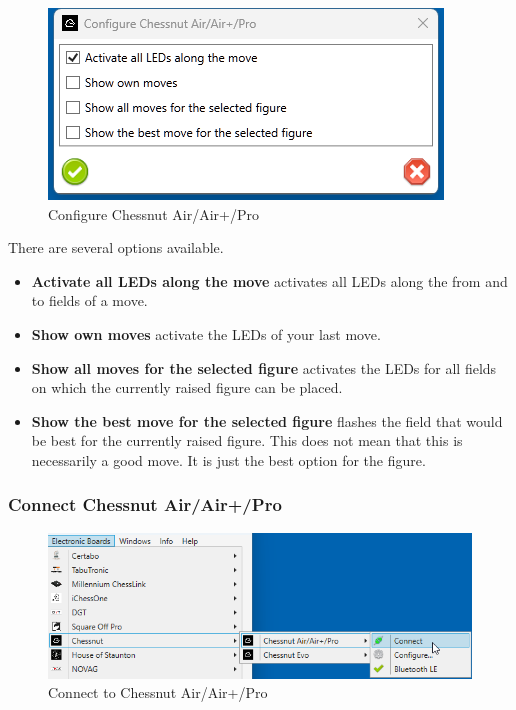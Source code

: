\documentclass[11pt,a4paper]{article}
\begin{document}
\begin{figure}[H]
	\centering
	\includegraphics[scale=1.0]{ChessnutAir6.png}
	\caption{Configure Chessnut Air/Air+/Pro}
	\label{fig:ChessnutAir6}
\end{figure}

There are several options available.
\begin{itemize}
	\item \textbf{Activate all LEDs along the move} activates all LEDs along the from and to fields of a move.
	\item \textbf{Show own moves} activate the LEDs of your last move.
	\item \textbf{Show all moves for the selected figure} activates the LEDs for all fields on which the currently raised figure can be placed.
	\item \textbf{Show the best move for the selected figure} flashes the field that would be best for the currently raised figure. This does not mean that this is necessarily a good move. It is just the best option for the figure.
\end{itemize}

\subsubsection{Connect Chessnut Air/Air+/Pro} \label{ConnectChessnutAir}
\begin{figure}[H]
	\centering
	\includegraphics[scale=0.7]{ChessnutAir1.png}
	\caption{Connect to Chessnut Air/Air+/Pro}
	\label{fig:ChessnutAir1}
\end{figure}
\end{document}

